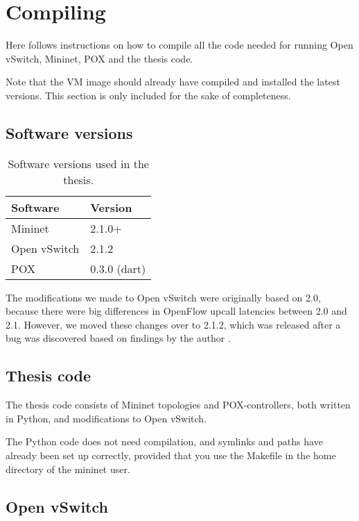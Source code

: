 \section{Compiling}
\label{chapter:compiling}

Here follows instructions on how to compile all the code needed for running
Open vSwitch, Mininet, POX and the thesis code.

Note that the VM image should already have compiled and installed the latest
versions.  This section is only included for the sake of completeness.

\subsection{Software versions}
\label{chapter:software.versions}

\begin{table}[H]
  \centering
  \begin{tabular}{ll}
  \hline
    \textbf{Software} & \textbf{Version} \\
  \hline
    Mininet & 2.1.0+ \\
    Open vSwitch & 2.1.2 \\
    POX & 0.3.0 (dart) \\
  \hline
  \end{tabular}
  \caption{Software versions used in the thesis.}
  \label{table:software.versions}
\end{table}

The modifications we made to Open vSwitch were
originally based on 2.0, because there were big differences in OpenFlow
upcall latencies between 2.0 and 2.1.  However, we moved these changes over
to 2.1.2, which was released after a bug was discovered based on findings by
the author \cite{ovs.bug}.

\subsection{Thesis code}

The thesis code consists of Mininet topologies and POX-controllers, both
written in Python, and modifications to Open vSwitch.

The Python code does not need compilation, and symlinks and paths have
already been set up correctly, provided that you use the Makefile in the
home directory of the mininet user.

\subsection{Open vSwitch}
\label{chapter:compiling.ovs}

